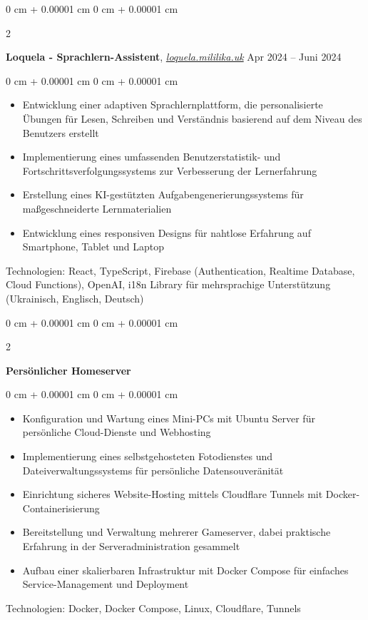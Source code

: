 \documentclass[10pt, letterpaper]{article}
\newenvironment{highlights}{
    \begin{itemize}[
        topsep=0.10 cm,
        parsep=0.10 cm,
        partopsep=0pt,
        itemsep=0pt,
        leftmargin=0 cm + 10pt
    ]
}{
    \end{itemize}
} %
\newenvironment{onecolentry}{
    \begin{adjustwidth}{
        0 cm + 0.00001 cm
    }{
        0 cm + 0.00001 cm
    }
}{
    \end{adjustwidth}
} %
\newenvironment{twocolentry}[2][]{
    \onecolentry
    \def\secondColumn{#2}
    \setcolumnwidth{\fill, 4.5 cm}
    \begin{paracol}{2}
}{
    \switchcolumn \raggedleft \secondColumn
    \end{paracol}
    \endonecolentry
} %
\let\hrefWithoutArrow\href
\begin{document}
    \begin{twocolentry}{
        Apr 2024 – Juni 2024
    }
        \textbf{Loquela - Sprachlern-Assistent}, \hrefWithoutArrow{https://loquela.mililika.uk}{\textit{loquela.mililika.uk}} \end{twocolentry}
    \vspace{0.20 cm}
    \begin{onecolentry}
        \begin{highlights}
            \item Entwicklung einer adaptiven Sprachlernplattform, die personalisierte Übungen für Lesen, Schreiben und Verständnis basierend auf dem Niveau des Benutzers erstellt
            \item Implementierung eines umfassenden Benutzerstatistik- und Fortschrittsverfolgungssystems zur Verbesserung der Lernerfahrung
            \item Erstellung eines KI-gestützten Aufgabengenerierungssystems für maßgeschneiderte Lernmaterialien
            \item Entwicklung eines responsiven Designs für nahtlose Erfahrung auf Smartphone, Tablet und Laptop
        \end{highlights}
    \end{onecolentry}
    \vspace{0.2 cm}
    Technologien: React, TypeScript, Firebase (Authentication, Realtime Database, Cloud Functions), OpenAI, i18n Library für mehrsprachige Unterstützung (Ukrainisch, Englisch, Deutsch)

    \vspace{0.4 cm}

    \begin{twocolentry}{}
        \textbf{Persönlicher Homeserver} \end{twocolentry}
    \vspace{0.20 cm}
    \begin{onecolentry}
        \begin{highlights}
            \item Konfiguration und Wartung eines Mini-PCs mit Ubuntu Server für persönliche Cloud-Dienste und Webhosting
            \item Implementierung eines selbstgehosteten Fotodienstes und Dateiverwaltungssystems für persönliche Datensouveränität
            \item Einrichtung sicheres Website-Hosting mittels Cloudflare Tunnels mit Docker-Containerisierung
            \item Bereitstellung und Verwaltung mehrerer Gameserver, dabei praktische Erfahrung in der Serveradministration gesammelt
            \item Aufbau einer skalierbaren Infrastruktur mit Docker Compose für einfaches Service-Management und Deployment
        \end{highlights}
    \end{onecolentry}
    \vspace{0.2 cm}
    Technologien: Docker, Docker Compose, Linux, Cloudflare, Tunnels
    
\end{document}
